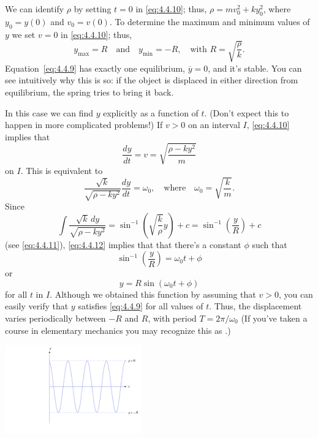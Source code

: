 \documentclass{ximera}
\begin{document}
\begin{example}
We can identify $\rho$ by setting $t=0$ in \eqref{eq:4.4.10};   thus,
$\rho=mv_0^2+ky_0^2$, where $y_0=y(0)$ and $v_0=v(0)$. To determine
the maximum and minimum values of $y$ we set $v=0$ in \eqref{eq:4.4.10};
thus,
\begin{equation} \label{eq:4.4.11}
y_{\max}=R\quad\mbox{and}\quad
y_{\min}=-R,\quad\mbox{with } R=\sqrt{\frac{\rho}{k}}.
\end{equation}
Equation~\eqref{eq:4.4.9} has exactly one equilibrium, $\overline{y}=0$,
and
it's stable. You can see intuitively why this is so: if the object is
displaced in either direction from  equilibrium, the spring tries
to bring it back.

In this case we can find $y$ explicitly as a function of $t$. (Don't
expect this to happen in more complicated problems!) If $v>0$ on an
interval $I$,  \eqref{eq:4.4.10} implies that
$$
\frac{dy}{dt}=v=\sqrt{\frac{\rho-ky^2}{m}}
$$
on $I$. This is equivalent to
\begin{equation} \label{eq:4.4.12}
\frac{\sqrt{k}}{\sqrt{\rho-ky^2}}\frac{dy}{dt}=\omega_0,\quad\mbox{where}\quad
\omega_0=\sqrt{\frac{k}{m}}.
\end{equation}
Since
$$
\int\frac{\sqrt{k}\,dy}{\sqrt{\rho-ky^2}}=\sin^{-1}\left(\sqrt{\frac{k}{\rho}}y\right)+c=\sin^{-1}\left(\frac{y}{R}\right)+c
$$
(see \eqref{eq:4.4.11}), \eqref{eq:4.4.12} implies that that there's a
constant $\phi$ such that
$$
\sin^{-1}\left(\frac{y}{R}\right)=\omega_0 t+\phi
$$
or
$$
y=R\sin(\omega_0 t+\phi)
$$
for all $t$ in $I$. Although we obtained this function by assuming that
$v>0$, you can easily verify that $y$ satisfies \eqref{eq:4.4.9} for all
values of $t$. Thus, the displacement varies periodically between $-R$
and $R$, with period $T=2\pi/\omega_0$ (If
you've taken a course in elementary mechanics you may recognize this
as .)


\begin{image}
 \includegraphics[height=1.5in]{fig040404.jpg} 
\end{image}

\end{example}
\end{document}
